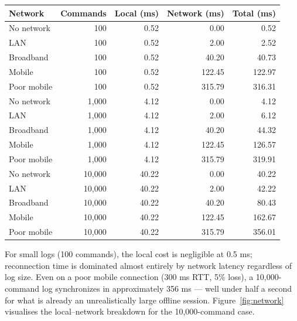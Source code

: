 \documentclass{article}
\begin{document}
\begin{center}
\begin{tabular}{lrrrr}
\hline
Network & Commands & Local (ms) & Network (ms) & Total (ms) \\
\hline
No network   & 100   & 0.52  & 0.00   & 0.52   \\
LAN          & 100   & 0.52  & 2.00   & 2.52   \\
Broadband    & 100   & 0.52  & 40.20  & 40.73  \\
Mobile       & 100   & 0.52  & 122.45 & 122.97 \\
Poor mobile  & 100   & 0.52  & 315.79 & 316.31 \\
\hline
No network   & 1,000 & 4.12  & 0.00   & 4.12   \\
LAN          & 1,000 & 4.12  & 2.00   & 6.12   \\
Broadband    & 1,000 & 4.12  & 40.20  & 44.32  \\
Mobile       & 1,000 & 4.12  & 122.45 & 126.57 \\
Poor mobile  & 1,000 & 4.12  & 315.79 & 319.91 \\
\hline
No network   & 10,000 & 40.22 & 0.00   & 40.22  \\
LAN          & 10,000 & 40.22 & 2.00   & 42.22  \\
Broadband    & 10,000 & 40.22 & 40.20  & 80.43  \\
Mobile       & 10,000 & 40.22 & 122.45 & 162.67 \\
Poor mobile  & 10,000 & 40.22 & 315.79 & 356.01 \\
\hline
\end{tabular}
\end{center}

For small logs (100 commands), the local cost is negligible at 0.5 ms; reconnection time is dominated almost entirely by network latency regardless of log size. Even on a poor mobile connection (300 ms RTT, 5\% loss), a 10,000-command log synchronizes in approximately 356 ms — well under half a second for what is already an unrealistically large offline session. Figure~\ref{fig:network} visualises the local–network breakdown for the 10,000-command case.
\end{document}
